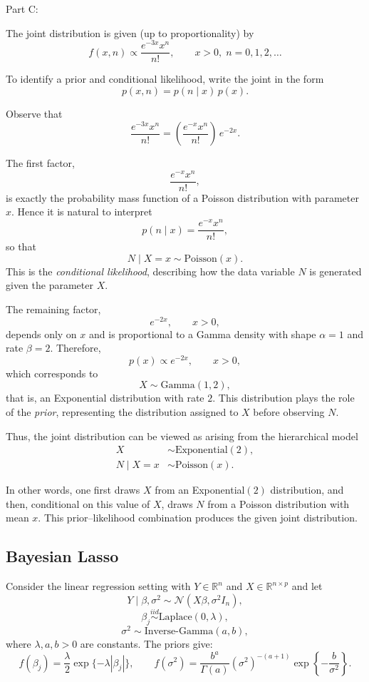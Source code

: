 \documentclass[hidelinks]{article}
\begin{document}
\medskip

\noindent Part C:

\noindent The joint distribution is given (up to proportionality) by
\[
f(x,n)\propto \frac{e^{-3x}x^n}{n!}, 
\qquad x>0,\; n=0,1,2,\ldots
\]

\noindent To identify a prior and conditional likelihood, write the joint in the form
\[
p(x,n)=p(n\mid x)\,p(x).
\]

\noindent Observe that
\[
\frac{e^{-3x}x^n}{n!}
=
\left(\frac{e^{-x}x^n}{n!}\right)\, e^{-2x}.
\]

\noindent The first factor,
\[
\frac{e^{-x}x^n}{n!},
\]
is exactly the probability mass function of a Poisson distribution with parameter $x$. Hence it is natural to interpret
\[
p(n\mid x)=\frac{e^{-x}x^n}{n!},
\]
so that
\[
N \mid X=x \sim \text{Poisson}(x).
\]
This is the \emph{conditional likelihood}, describing how the data variable $N$ is generated given the parameter $X$.

\noindent The remaining factor,
\[
e^{-2x}, \qquad x>0,
\]
depends only on $x$ and is proportional to a Gamma density with shape $\alpha=1$ and rate $\beta=2$. Therefore,
\[
p(x) \propto e^{-2x}, \qquad x>0,
\]
which corresponds to
\[
X \sim \text{Gamma}(1,2),
\]
that is, an Exponential distribution with rate $2$. This distribution plays the role of the \emph{prior}, representing the distribution assigned to $X$ before observing $N$.

\noindent Thus, the joint distribution can be viewed as arising from the hierarchical model
\[
\boxed{
\begin{aligned}
X &\sim \text{Exponential}(2), \\
N \mid X=x &\sim \text{Poisson}(x).
\end{aligned}}
\]

\noindent In other words, one first draws $X$ from an Exponential$(2)$ distribution, and then, conditional on this value of $X$, draws $N$ from a Poisson distribution with mean $x$. This prior–likelihood combination produces the given joint distribution.

\subsection{Bayesian Lasso}

\noindent Consider the linear regression setting with $Y \in \mathbb{R}^n$ and 
$X \in \mathbb{R}^{n \times p}$ and let
\[
Y \mid \beta, \sigma^2 \sim \mathcal{N}(X\beta, \sigma^2 I_n),
\]
\[
\beta_j \stackrel{iid}{\sim} \text{Laplace}(0,\lambda),
\]
\[
\sigma^2 \sim \text{Inverse-Gamma}(a,b),
\]
where $\lambda, a, b > 0$ are constants. The priors give:
\[
f(\beta_j) = \frac{\lambda}{2}\exp\{-\lambda |\beta_j|\},
\qquad
f(\sigma^2) = \frac{b^a}{\Gamma(a)}(\sigma^2)^{-(a+1)} 
\exp\left\{-\frac{b}{\sigma^2}\right\}.
\]
\end{document}
